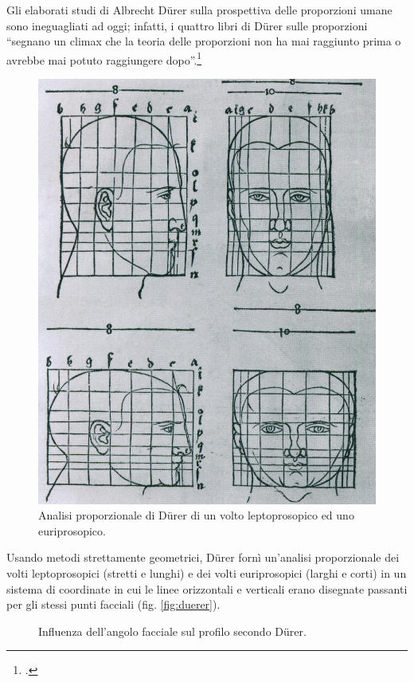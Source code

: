 Gli elaborati studi di Albrecht Dürer sulla prospettiva delle proporzioni umane sono ineguagliati ad oggi; infatti, i quattro libri di Dürer sulle proporzioni ``segnano un climax che la teoria delle proporzioni non ha mai raggiunto prima o avrebbe mai potuto raggiungere dopo''.\footcite{Panofsky1974}

\begin{figure}
\centering
\includegraphics[width=.4\textwidth]{./images/duerer-proportional.jpg}
\caption{Analisi proporzionale di Dürer di un volto leptoprosopico ed uno euriprosopico.}
\label{fig:duerer}
\end{figure}

Usando metodi strettamente geometrici, Dürer fornì un'analisi proporzionale dei volti leptoprosopici (stretti e lunghi) e dei volti euriprosopici (larghi e corti) in un sistema di coordinate in cui le linee orizzontali e verticali erano disegnate passanti per gli stessi punti facciali (fig. \vref{fig:duerer}).

\begin{figure}
\centering
{}
\caption{Influenza dell'angolo facciale sul profilo secondo Dürer.}
\label{fig:duerer2}
\end{figure}

